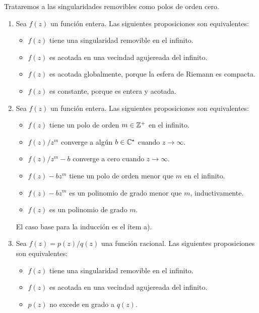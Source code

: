 \begin{solution}
Trataremos a las singularidades removibles como polos de orden cero.
\begin{enumerate}[label=(\alph*)]
    \item Sea $f(z)$ un función entera. Las siguientes proposiciones son equivalentes:
    \begin{itemize}
        \item $f(z)$ tiene una singularidad removible en el infinito.
        \item $f(z)$ es acotada en una vecindad agujereada del infinito.
        \item $f(z)$ es acotada globalmente, porque la esfera de Riemann es compacta.
        \item $f(z)$ es constante, porque es entera y acotada.
    \end{itemize}
    
    \item Sea $f(z)$ un función entera. Las siguientes proposiciones son equivalentes:
    \begin{itemize}
        \item $f(z)$ tiene un polo de orden $m \in \mathbb Z^+$ en el infinito.
        \item $f(z) / z^m$ converge a algún $b \in \mathbb C^\star$ cuando $z \to \infty$.
        \item $f(z) / z^m - b$ converge a cero cuando $z \to \infty$.
        \item $f(z) - bz^m$ tiene un polo de orden menor que $m$ en el infinito.
        \item $f(z) - bz^m$ es un polinomio de grado menor que $m$, inductivamente.
        \item $f(z)$ es un polinomio de grado $m$.
    \end{itemize}
    
    El caso base para la inducción es el ítem a).
    
    \item Sea $f(z) = p(z) / q(z)$ una función racional. Las siguientes proposiciones son equivalentes:
    \begin{itemize}
        \item $f(z)$ tiene una singularidad removible en el infinito.
        \item $f(z)$ es acotada en una vecindad agujereada del infinito.
        \item $p(z)$ no excede en grado a $q(z)$.
    \end{itemize}
    

\end{enumerate}
\end{solution}
